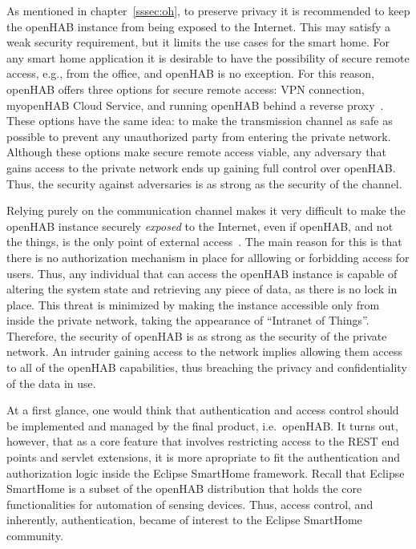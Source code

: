 \documentclass[12pt]{article}
\begin{document}
As mentioned in chapter~\ref{sssec:oh}, to preserve privacy it is recommended to keep the openHAB instance from being exposed to the Internet. This may satisfy a weak security requirement, but it limits the use cases for the smart home. For any smart home application it is desirable to have the possibility of secure remote access, e.g., from the office, and openHAB is no exception. For this reason, openHAB offers three options for secure remote access: VPN connection, myopenHAB Cloud Service, and running openHAB behind a reverse proxy~\cite{openhab_04}. These options have the same idea: to make the transmission channel as safe as possible to prevent any unauthorized party from entering the private network. Although these options make secure remote access viable, any adversary that gains access to the private network ends up gaining full control over openHAB. Thus, the security against adversaries is as strong as the security of the channel.

Relying purely on the communication channel makes it very difficult to make the openHAB instance securely \emph{exposed} to the Internet, even if openHAB, and not the things, is the only point of external access~\cite{openhab_03}. The main reason for this is that there is no authorization mechanism in place for alllowing or forbidding access for users. Thus, any individual that can access the openHAB instance is capable of altering the system state and retrieving any piece of data, as there is no lock in place. This threat is minimized by making the instance accessible only from inside the private network, taking the appearance of ``Intranet of Things''.  Therefore, the security of openHAB is as strong as the security of the private network. An intruder gaining access to the network implies allowing them access to all of the openHAB capabilities, thus breaching the privacy and confidentiality of the data in use.

At a first glance, one would think that authentication and access control should be implemented and managed by the final product, i.e.\ openHAB. It turns out, however, that as a core feature that involves restricting access to the REST end points and servlet extensions, it is more apropriate to fit the authentication and authorization logic inside the Eclipse SmartHome framework. Recall that Eclipse SmartHome is a subset of the openHAB distribution that holds the core functionalities for automation of sensing devices. Thus, access control, and inherently, authentication, became of interest to the Eclipse SmartHome community. 
\end{document}
